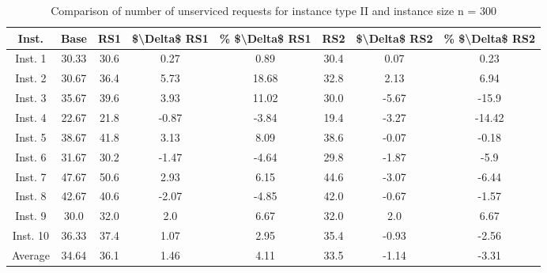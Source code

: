 \begin{table}[H]
\centering
\begin{tabular}{cccccccc}
  \hline
  \textbf{Inst.} & \textbf{Base} & \textbf{RS1} & \textbf{\$\textbackslash{}Delta\$  RS1} & \textbf{\% \$\textbackslash{}Delta\$  RS1} & \textbf{RS2} & \textbf{\$\textbackslash{}Delta\$  RS2} & \textbf{\% \$\textbackslash{}Delta\$  RS2} \\\hline
  Inst. 1 & 30.33 & 30.6 & 0.27 & 0.89 & 30.4 & 0.07 & 0.23 \\
  Inst. 2 & 30.67 & 36.4 & 5.73 & 18.68 & 32.8 & 2.13 & 6.94 \\
  Inst. 3 & 35.67 & 39.6 & 3.93 & 11.02 & 30.0 & -5.67 & -15.9 \\
  Inst. 4 & 22.67 & 21.8 & -0.87 & -3.84 & 19.4 & -3.27 & -14.42 \\
  Inst. 5 & 38.67 & 41.8 & 3.13 & 8.09 & 38.6 & -0.07 & -0.18 \\
  Inst. 6 & 31.67 & 30.2 & -1.47 & -4.64 & 29.8 & -1.87 & -5.9 \\
  Inst. 7 & 47.67 & 50.6 & 2.93 & 6.15 & 44.6 & -3.07 & -6.44 \\
  Inst. 8 & 42.67 & 40.6 & -2.07 & -4.85 & 42.0 & -0.67 & -1.57 \\
  Inst. 9 & 30.0 & 32.0 & 2.0 & 6.67 & 32.0 & 2.0 & 6.67 \\
  Inst. 10 & 36.33 & 37.4 & 1.07 & 2.95 & 35.4 & -0.93 & -2.56 \\
  Average & 34.64 & 36.1 & 1.46 & 4.11 & 33.5 & -1.14 & -3.31 \\\hline
\end{tabular}
\caption{Comparison of number of unserviced requests for instance type II and instance size n = 300}
\label{tab:wait:resrelocation-nTaxi-comparison_II_300}
\end{table}
